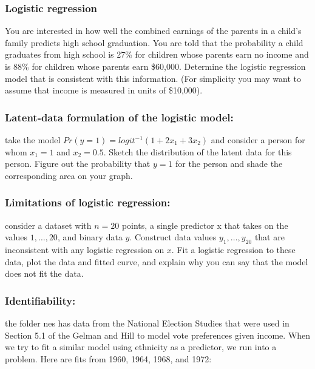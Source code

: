 \documentclass[]{article}
\begin{document}
\subsubsection{Logistic regression}\label{logistic-regression}

You are interested in how well the combined earnings of the parents in a
child's family predicts high school graduation. You are told that the
probability a child graduates from high school is 27\% for children
whose parents earn no income and is 88\% for children whose parents earn
\$60,000. Determine the logistic regression model that is consistent
with this information. (For simplicity you may want to assume that
income is measured in units of \$10,000).

\subsubsection{Latent-data formulation of the logistic
model:}\label{latent-data-formulation-of-the-logistic-model}

take the model \(Pr(y = 1) = logit^{-1}(1 + 2x_1 + 3x_2)\) and consider
a person for whom \(x_1 = 1\) and \(x_2 = 0.5\). Sketch the distribution
of the latent data for this person. Figure out the probability that
\(y=1\) for the person and shade the corresponding area on your graph.

\subsubsection{Limitations of logistic
regression:}\label{limitations-of-logistic-regression}

consider a dataset with \(n = 20\) points, a single predictor x that
takes on the values \(1, \dots , 20\), and binary data \(y\). Construct
data values \(y_{1}, \dots, y_{20}\) that are inconsistent with any
logistic regression on \(x\). Fit a logistic regression to these data,
plot the data and fitted curve, and explain why you can say that the
model does not fit the data.

\subsubsection{Identifiability:}\label{identifiability}

the folder nes has data from the National Election Studies that were
used in Section 5.1 of the Gelman and Hill to model vote preferences
given income. When we try to fit a similar model using ethnicity as a
predictor, we run into a problem. Here are fits from 1960, 1964, 1968,
and 1972:
\end{document}
